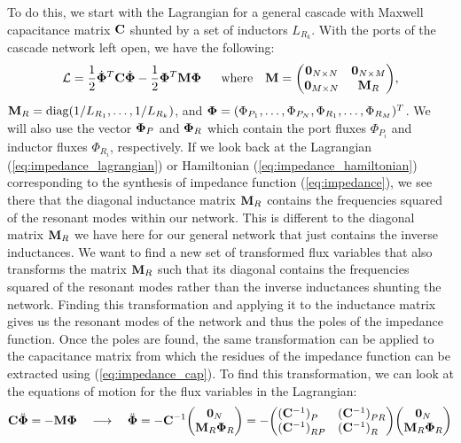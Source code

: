To do this, we start with the Lagrangian for a general cascade with Maxwell capacitance matrix $\vb{C}$ shunted by a set of inductors $L_{R_k}$. With the ports of the cascade network left open, we have the following:
\begin{equation}
    \mathcal{L} = \frac{1}{2}\dot{\vb{\Phi}}^T \vb{C} \dot{\vb{\Phi}} - \frac{1}{2}\vb{\Phi}^T \vb{M} \vb{\Phi}^{\phantom{^T}} \quad\text{where}\quad \vb{M} = \mqty( \vb{0}_{N \times N} & \vb{0}_{N \times M} \\ \vb{0}_{M \times N} & \vb{M}_R ),
\end{equation}
$\vb{M}_R = \operatorname{diag}(1/L_{R_1},\dots,1/L_{R_k})$, and $\vb{\Phi} = (\Phi_{P_1}, \dots, \Phi_{P_N}, \Phi_{R_1}, \dots, \Phi_{R_M})^T$. We will also use the vector $\vb{\Phi}_P$ and $\vb{\Phi}_R$ which contain the port fluxes $\Phi_{P_i}$ and inductor fluxes $\Phi_{R_i}$, respectively. If we look back at the Lagrangian (\ref{eq:impedance_lagrangian}) or Hamiltonian (\ref{eq:impedance_hamiltonian}) corresponding to the synthesis of impedance function (\ref{eq:impedance}), we see there that the diagonal inductance matrix $\vb{M}_R$ contains the frequencies squared of the resonant modes within our network. This is different to the diagonal matrix $\vb{M}_R$ we have here for our general network that just contains the inverse inductances. We want to find a new set of transformed flux variables that also transforms the matrix $\vb{M}_R$ such that its diagonal contains the frequencies squared of the resonant modes rather than the inverse inductances shunting the network. Finding this transformation and applying it to the inductance matrix gives us the resonant modes of the network and thus the poles of the impedance function. Once the poles are found, the same transformation can be applied to the capacitance matrix from which the residues of the impedance function can be extracted using (\ref{eq:impedance_cap}). To find this transformation, we can look at the equations of motion for the flux variables in the Lagrangian:
\begin{equation}
    \vb{C}\ddot{\vb{\Phi}} = -\vb{M} \vb{\Phi} \quad\longrightarrow\quad \ddot{\vb{\Phi}} = -\vb{C}^{-1}\mqty(\vb{0}_N \\ \vb{M}_R \vb{\Phi}_R) = -\mqty( (\vb{C}^{-1})^{\phantom{RP}}_P & (\vb{C}^{-1})^{\phantom{RP}}_{PR} \\ (\vb{C}^{-1})^{\phantom{RP}}_{RP} & (\vb{C}^{-1})^{\phantom{RP}}_R )\mqty(\vb{0}_N \\ \vb{M}_R \vb{\Phi}_R)
\end{equation}

